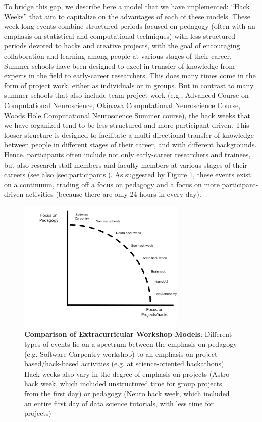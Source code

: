 To bridge this gap, we describe here a model that we have implemented: ``Hack Weeks'' that aim to capitalize on the advantages of each of these models.
These week-long events combine structured periods focused on pedagogy (often with an emphasis on statistical and computational techniques) with less structured periods devoted to hacks and creative projects, with the goal of encouraging collaboration and learning among people at various stages of their career. 
Summer schools have been designed to excel in transfer of knowledge from experts in the field to early-career researchers. This does many times come in the form of project work, either as individuals or in groups. But in contrast to many summer schools that also include team project work (e.g., Advanced Course on Computational Neuroscience, Okinawa Computational Neuroscience Course, Woods Hole Computational Neuroscience Summer course), the hack weeks that we have organized tend to be less structured and more participant-driven. This looser structure is designed to facilitate a multi-directional transfer of knowledge between people in different stages of their career, and with different backgrounds. Hence, participants often include not only early-career researchers and trainees, but also research staff members and faculty members at various stages of their careers (see also \ref{sec:participants}). As suggested by Figure \ref{fig:hackspectrum}, these events exist on a continuum, trading off a focus on pedagogy and a focus on more participant-driven activities (because there are only 24 hours in every day).   

\begin{figure}
\begin{center}
\includegraphics[width=8cm]{NewHackSpectrum.pdf}
\caption{{\bf Comparison of Extracurricular Workshop Models}: Different types of events lie on a spectrum between the emphasis on pedagogy (e.g. Software Carpentry workshop) to an emphasis on project-based/hack-based activities (e.g. at science-oriented hackathons). Hack weeks also vary in the degree of emphasis on projects (Astro hack week, which included unstructured time for group projects from the first day) or pedagogy (Neuro hack week, which included an entire first day of data science tutorials, with less time for projects)}
\label{fig:hackspectrum}
\end{center}
\end{figure}

